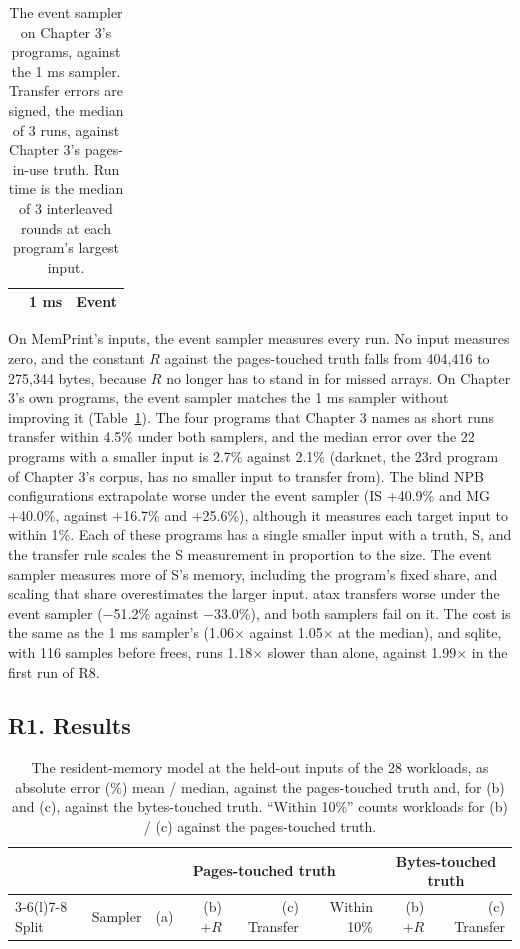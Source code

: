 \documentclass[11pt]{article}
\newcommand{\tabinput}[1]{}
\newcommand{\memprint}{MemPrint}
\begin{document}
\begin{table}[htbp]
\centering
\caption{The event sampler on Chapter 3's programs, against the 1 ms sampler. Transfer errors are signed, the
median of 3 runs, against Chapter 3's pages-in-use truth. Run time is the median of 3 interleaved rounds at each
program's largest input.}
\label{tab:r8}
\small
\begin{tabular}{@{}lrr@{}}
\toprule
& 1 ms & Event \\
\midrule
\tabinput{r8}
\bottomrule
\end{tabular}
\end{table}

On \memprint{}'s inputs, the event sampler measures every run. No input measures zero, and the constant $R$
against the pages-touched truth falls from 404,416 to 275,344 bytes, because $R$ no longer has to stand in for
missed arrays. On Chapter 3's own programs, the event sampler matches the 1 ms sampler without improving it
(Table~\ref{tab:r8}). The four programs that Chapter 3 names as short runs transfer within 4.5\% under both
samplers, and the median error over the 22 programs with a smaller input is 2.7\% against 2.1\% (darknet, the
23rd program of Chapter 3's corpus, has no smaller input to transfer from). The blind NPB configurations extrapolate
worse under the event sampler (IS +40.9\% and MG +40.0\%, against +16.7\% and +25.6\%), although it measures each
target input to within 1\%. Each of these programs has a single smaller input with a truth, S, and the transfer
rule scales the S measurement in proportion to the size. The event sampler measures more of S's memory, including
the program's fixed share, and scaling that share overestimates the larger input. atax transfers worse under the
event sampler ($-$51.2\% against $-$33.0\%), and both samplers fail on it. The cost is the same as the 1 ms
sampler's (1.06$\times$ against 1.05$\times$ at the median), and sqlite, with 116 samples before frees, runs
1.18$\times$ slower than alone, against 1.99$\times$ in the first run of R8.

\subsection{R1. Results}
\label{sec:r1}

\begin{table}[htbp]
\centering
\caption{The resident-memory model at the held-out inputs of the 28 workloads, as absolute error (\%) mean /
median, against the pages-touched truth and, for (b) and (c), against the bytes-touched truth. ``Within 10\%''
counts workloads for (b) / (c) against the pages-touched truth.}
\label{tab:r1}
\footnotesize
\setlength{\tabcolsep}{3.5pt}
\begin{tabular}{@{}llrrrrrr@{}}
\toprule
& & \multicolumn{4}{c}{Pages-touched truth} & \multicolumn{2}{c}{Bytes-touched truth} \\
\cmidrule(lr){3-6}\cmidrule(l){7-8}
Split & Sampler & (a) & (b) $+R$ & (c) Transfer & Within 10\% & (b) $+R$ & (c) Transfer \\
\midrule
\tabinput{r1p}
\bottomrule
\end{tabular}
\end{table}
\end{document}
